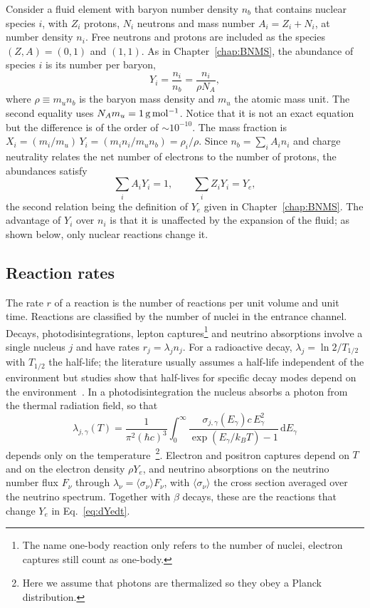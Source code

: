 Consider a fluid element with baryon number density $n_b$ that contains nuclear species $i$, with $Z_i$ protons, $N_i$ neutrons and mass number $A_i=Z_i+N_i$, at number density $n_i$.
Free neutrons and protons are included as the species $(Z,A)=(0,1)$ and $(1,1)$.
As in Chapter~\ref{chap:BNMS}, the abundance of species $i$ is its number per baryon,
\begin{equation}\label{eq:abundance}
  Y_i=\frac{n_i}{n_b}=\frac{n_i}{\rho N_A},
\end{equation}
where $\rho\equiv m_u n_b$ is the baryon mass density and $m_u$ the atomic mass unit.
The second equality uses $N_A m_u=1\,\rm{g\,mol^{-1}}$.
Notice that it is not an exact equation but the difference is of the order of $\sim10^{-10}$.
The mass fraction is $X_i=(m_i/m_u)\,Y_i=(m_in_i/m_un_b)=\rho_i/\rho$.
Since $n_b=\sum_iA_in_i$ and charge neutrality relates the net number of electrons to the number of protons, the abundances satisfy
\begin{equation}\label{eq:conservation}
  \sum_i A_iY_i=1, \qquad \sum_i Z_iY_i=Y_e ,
\end{equation}
the second relation being the definition of $Y_e$ given in Chapter~\ref{chap:BNMS}.
The advantage of $Y_i$ over $n_i$ is that it is unaffected by the expansion of the fluid; as shown below, only nuclear reactions change it.

\subsection{Reaction rates}\label{sec:rates}

The rate $r$ of a reaction is the number of reactions per unit volume and unit time.
Reactions are classified by the number of nuclei in the entrance channel.
Decays, photodisintegrations, lepton captures\footnote{The name one-body reaction only refers to the number of nuclei, electron captures still count as one-body. } and neutrino absorptions involve a single nucleus $j$ and have rates $r_j=\lambda_j n_j$.
For a radioactive decay, $\lambda_j=\ln 2/T_{1/2}$ with $T_{1/2}$ the half-life; the literature usually assumes a half-life independent of the environment but studies show that half-lives for specific decay modes depend on the environment~\cite{rojas-gamboa__2024}.
In a photodisintegration the nucleus absorbs a photon from the thermal radiation field, so that
\begin{equation}\label{eq:photo}
  \lambda_{j,\gamma}(T)=\frac{1}{\pi^2(\hbar c)^3}\int_0^\infty \frac{\sigma_{j,\gamma}(E_\gamma)c\,E_\gamma^2}{\exp\left(E_\gamma/k_BT\right)-1}\,\mathrm{d}E_\gamma
\end{equation}
depends only on the temperature~\footnote{Here we assume that photons are thermalized so they obey a Planck distribution.}.
Electron and positron captures depend on $T$ and on the electron density $\rho Y_e$, and neutrino absorptions on the neutrino number flux $F_\nu$ through $\lambda_\nu=\langle\sigma_\nu\rangle F_\nu$, with $\langle\sigma_\nu\rangle$ the cross section averaged over the neutrino spectrum.
Together with $\beta$ decays, these are the reactions that change $Y_e$ in Eq.~\ref{eq:dYedt}.


